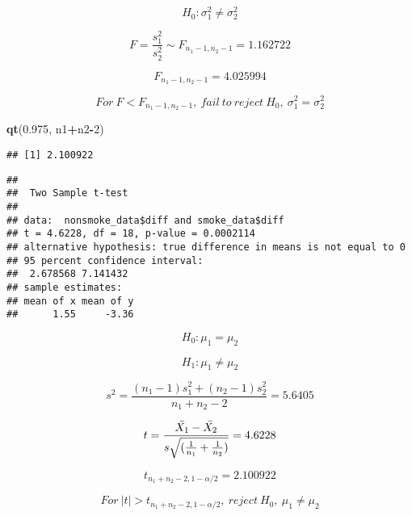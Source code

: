 \documentclass[]{article}
\newenvironment{Shaded}{\begin{snugshade}}{\end{snugshade}}
\newcommand{\KeywordTok}[1]{\textcolor[rgb]{0.13,0.29,0.53}{\textbf{#1}}}
\newcommand{\DataTypeTok}[1]{\textcolor[rgb]{0.13,0.29,0.53}{#1}}
\newcommand{\DecValTok}[1]{\textcolor[rgb]{0.00,0.00,0.81}{#1}}
\newcommand{\FloatTok}[1]{\textcolor[rgb]{0.00,0.00,0.81}{#1}}
\newcommand{\OtherTok}[1]{\textcolor[rgb]{0.56,0.35,0.01}{#1}}
\newcommand{\OperatorTok}[1]{\textcolor[rgb]{0.81,0.36,0.00}{\textbf{#1}}}
\newcommand{\NormalTok}[1]{#1}
\begin{document}
\[
H_{0}: \sigma_{1} ^{2} \neq  \sigma_{2} ^{2}
\]

\[
F= \frac{s_{1}^{2}}{s_{2}^{2}}\sim F_{n_{1}-1,n_{2}-1}=1.162722 
\]

\[
F_{n_{1}-1,n_{2}-1} = 4.025994
\]

\[
For\ F< F_{n_{1}-1,n_{2}-1},\ fail\ to\ reject\ H_{0},\ \sigma_{1} ^{2} = \sigma_{2} ^{2}
\]

\begin{Shaded}
\begin{Highlighting}[]
\KeywordTok{qt}\NormalTok{(}\FloatTok{0.975}\NormalTok{, n1}\OperatorTok{+}\NormalTok{n2}\OperatorTok{-}\DecValTok{2}\NormalTok{)}
\end{Highlighting}
\end{Shaded}

\begin{verbatim}
## [1] 2.100922
\end{verbatim}

\begin{Shaded}
\end{Shaded}

\begin{verbatim}
## 
##  Two Sample t-test
## 
## data:  nonsmoke_data$diff and smoke_data$diff
## t = 4.6228, df = 18, p-value = 0.0002114
## alternative hypothesis: true difference in means is not equal to 0
## 95 percent confidence interval:
##  2.678568 7.141432
## sample estimates:
## mean of x mean of y 
##      1.55     -3.36
\end{verbatim}

\[
H_{0} : \mu_{1} = \mu_{2}
\]

\[
H_{1} : \mu_{1} \neq \mu_{2}
\]

\[
s^{2} = \frac{(n_{1}-1)s_{1}^{2}+(n_{2}-1)s_{2}^{2}}{n_{1}+n_{2}-2}= 5.6405
\]

\[
t = \frac{\bar{X_{1}}-\bar{X_{2}}}{s\sqrt{(\frac{1}{n_{1}}+\frac{1}{n_{2}})}}=4.6228\\
\]

\[
t_{n_{1}+n_{2}-2, 1-\alpha /2}=2.100922
\]

\[
For\ \left | t \right |>t_{n_{1}+n_{2}-2, 1-\alpha /2},\ reject\ H_{0},\ \mu_{1} \neq \mu_{2}
\]
\end{document}

